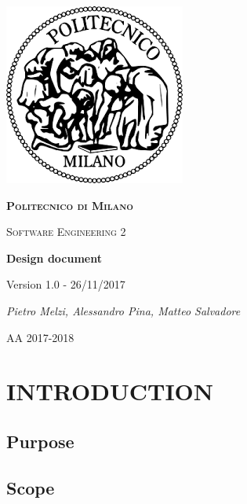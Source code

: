 \documentclass[11pt]{report}
\begin{document}
	\begin{titlepage}
		\centering
		\includegraphics{logo.png}\par\vspace{1cm}
		{\scshape\LARGE\bfseries Politecnico di Milano \par}
		\vspace{1cm}
		{\scshape\Large Software Engineering 2\par}
		\vspace{1.5cm}
		{\Huge\bfseries Design document\par}
		\vspace{1cm}
		{\small Version 1.0 - 26/11/2017\par}
		\vspace{4cm}
		{\Large\itshape Pietro Melzi, Alessandro Pina, Matteo Salvadore\par}

		\vfill

		{\large AA 2017-2018\par}
	\end{titlepage}

	\tableofcontents{}

	\chapter{INTRODUCTION}
	\label{ch:INTRODUCTION}
	
		\section{Purpose}
		\label{sect:Purpose}
			
			
		\section{Scope}
		\label{sect:Scope}
			
			
\end{document}
